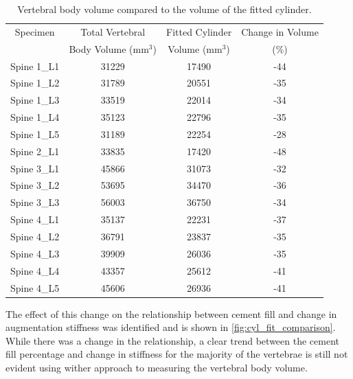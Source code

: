 \begin{table}[ht!]
\centering
  \caption{Vertebral body volume compared to the volume of the fitted
cylinder.}
	\label{tab:vertebrae_vol_cyl}
  \begin{tabular}{c |c|c|c}
	  Specimen & Total Vertebral  & Fitted Cylinder & Change in Volume\\ 
	  &Body Volume (mm$^3$)&Volume (mm$^3$) &(\%)\\ \hline \hline
	  Spine 1\_L1  & 31229 & 17490 & -44\\
	  Spine 1\_L2  & 31789 & 20551 & -35\\
	  Spine 1\_L3  & 33519 & 22014 & -34\\
	  Spine 1\_L4  & 35123 & 22796 & -35\\
	  Spine 1\_L5  & 31189 & 22254 & -28\\
	  Spine 2\_L1  & 33835 & 17420 & -48\\
	  Spine 3\_L1  & 45866 & 31073 & -32\\
	  Spine 3\_L2  & 53695 & 34470 & -36\\
	  Spine 3\_L3  & 56003 & 36750 & -34\\
	  Spine 4\_L1  & 35137 & 22231 & -37\\
	  Spine 4\_L2  & 36791 & 23837 & -35\\
	  Spine 4\_L3  & 39909 & 26036 & -35\\
	  Spine 4\_L4  & 43357 & 25612 & -41\\
	  Spine 4\_L5  & 45606 & 26936 & -41\\
	  \hline
  \end{tabular}

\end{table}

The effect of this change on the relationship between cement fill and change in
augmentation stiffness was identified and is shown in
\cref{fig:cyl_fit_comparison}.
While there was a change in the relationship, a clear trend between the cement
fill percentage and change in stiffness for the majority of the vertebrae is
still not evident using wither approach to measuring the vertebral body volume.

